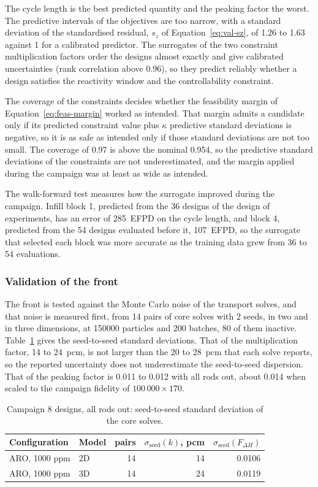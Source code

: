 The cycle length is the best predicted quantity and the peaking factor
the worst. The predictive intervals of the objectives are too narrow,
with a standard deviation of the standardised residual,
$s_z$ of Equation~\eqref{eq:val-sz}, of 1.26 to 1.63 against 1 for a
calibrated predictor. The surrogates of the two constraint
multiplication factors order the designs almost exactly and give
calibrated uncertainties (rank correlation above 0.96), so they predict
reliably whether a design satisfies the reactivity window and the
controllability constraint.

The coverage of the constraints decides whether the feasibility margin
of Equation~\eqref{eq:feas-margin} worked as intended. That margin
admits a candidate only if its predicted constraint value plus $\kappa$
predictive standard deviations is negative, so it is as safe as
intended only if those standard deviations are not too small. The
coverage of 0.97 is above the nominal 0.954, so the predictive
standard deviations of the constraints are not underestimated, and the
margin applied during the campaign was at least as wide as intended.

The walk-forward test measures how the surrogate improved during the
campaign. Infill block 1, predicted from the 36 designs of the design
of experiments, has an error of \SI{285}{EFPD} on the cycle length,
and block 4, predicted from the 54 designs evaluated before it,
\SI{107}{EFPD}, so the surrogate that selected each block was more
accurate as the training data grew from 36 to 54 evaluations.

\subsubsection{Validation of the front}
\label{sec:res-c8-stability}

The front is tested against the Monte Carlo noise of the transport
solves, and that noise is measured first, from 14 pairs of core
solves with 2 seeds, in two and in three dimensions, at \num{150000}
particles and 200 batches, 80 of them inactive. Table~\ref{tab:c8-post-sigma} gives the
seed-to-seed standard deviations. That of the multiplication factor, 14 to
\SI{24}{pcm}, is not larger than the 20 to \SI{28}{pcm} that each solve
reports, so the reported uncertainty does not underestimate the
seed-to-seed dispersion. That of the peaking factor is 0.011 to 0.012
with all rods out, about 0.014 when scaled to the campaign fidelity of
$100\,000 \times 170$.

\begin{table}[htbp]
  \centering
  \footnotesize
  \caption{Campaign 8 designs, all rods out: seed-to-seed standard deviation of the core solves.}
  \label{tab:c8-post-sigma}
  \begin{tabular}{@{}l l r r r@{}}
    \toprule
    Configuration & Model & pairs & $\sigma_\mathrm{seed}(k)$, pcm & $\sigma_\mathrm{seed}(F_{\Delta H})$ \\
    \midrule
    ARO, 1000 ppm & 2D & 14 & 14 & 0.0106 \\
    ARO, 1000 ppm & 3D & 14 & 24 & 0.0119 \\
    \bottomrule
  \end{tabular}
\end{table}

